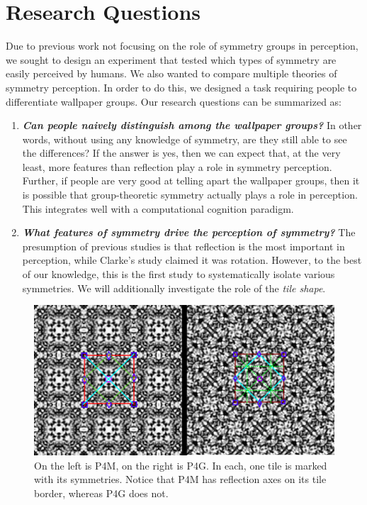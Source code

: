 \section{Research Questions}
Due to previous work not focusing on the role of symmetry groups in perception, we sought to design an experiment that tested which types of symmetry are easily perceived by humans. We also wanted to compare multiple theories of symmetry perception. In order to do this, we designed a task requiring people to differentiate wallpaper groups. Our research questions can be summarized as:

\begin{enumerate}
\item {\textbf{\textit{Can people naively distinguish among the wallpaper groups?}} In other words, without using any knowledge of symmetry, are they still able to see the differences? If the answer is yes, then we can expect that, at the very least, more features than reflection play a role in symmetry perception. Further, if people are very good at telling apart the wallpaper groups, then it is possible that group-theoretic symmetry actually plays a role in perception. This integrates well with a computational cognition paradigm.}
\item {\textbf{\textit{What features of symmetry drive the perception of symmetry?}} The presumption of previous studies is that reflection is the most important in perception, while Clarke's study claimed it was rotation. However, to the best of our knowledge, this is the first study to systematically isolate various symmetries. We will additionally investigate the role of the \textit{tile shape}}.
\end{enumerate}

\begin{figure}[!ht]
\centering
\includegraphics[width=0.9\columnwidth]{ann_images}
\caption{On the left is P4M, on the right is P4G. In each, one tile is marked with its symmetries. Notice that P4M has reflection axes on its tile border, whereas P4G does not.}
\label{fig:P4GvP4M}
\end{figure}


